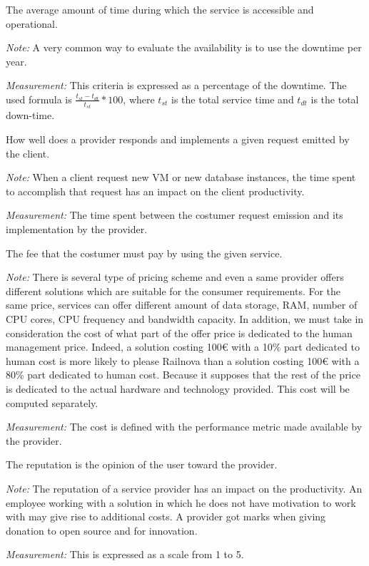 \documentclass[a4paper,11pt]{article}
\begin{document}
\begin{description}[parsep=10pt,listparindent=\parindent,labelindent=\parindent,font=$\bullet$\ ]
  \item[Availability:] The average amount of time during which the service is accessible and operational.
    \par \emph{Note:} A very common way to evaluate the availability is to use the downtime per year.
    \par \emph{Measurement:} This criteria is expressed as a percentage of the downtime. The used formula is $\frac{t_{st}-t_{dt}}{t_{st}}*100$, where $t_{st}$ is the total service time and $t_{dt}$ is the total down-time.

  \item[Service efficiency:] How well does a provider responds and implements a given request emitted by the client.
     \par \emph{Note:} When a client request new VM or new database instances, the time spent to accomplish that request has an impact on the client productivity.
    \par \emph{Measurement:} The time spent between the costumer request emission and its implementation by the provider.

  \item[Cost:] The fee that the costumer must pay by using the given service.
    \par \emph{Note:} There is several type of pricing scheme and even a same provider offers different solutions which are suitable for the consumer requirements. For the same price, services can offer different amount of data storage, RAM, number of CPU cores, CPU frequency and bandwidth capacity. In addition, we must take in consideration the cost of what part of the offer price is dedicated to the human management price. Indeed, a solution costing 100\euro{} with a 10\% part dedicated to human cost is more likely to please Railnova than a solution costing 100\euro{} with a 80\% part dedicated to human cost. Because it supposes that the rest of the price is dedicated to the actual hardware and technology provided. This cost will be computed separately.
    \par \emph{Measurement:} The cost is defined with the performance metric made available by the provider.

  \item[Reputation:] The reputation is the opinion of the user toward the provider.
    \par \emph{Note:} The reputation of a service provider has an impact on the productivity. An employee working with a solution in which he does not have motivation to work with may give rise to additional costs. A provider got marks when giving donation to open source and for innovation.
    \par \emph{Measurement:} This is expressed as a scale from 1 to 5.
    

\end{description}
\end{document}
